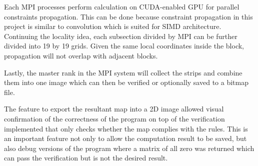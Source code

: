 Each MPI processes perform calculation on CUDA-enabled GPU for parallel constraints propagation. This can be done because constraint propagation in this project is similar to convolution which is suited for SIMD architecture. Continuing the locality idea, each subsection divided by MPI can be further divided into 19 by 19 grids. Given the same local coordinates inside the block, propagation will not overlap with adjacent blocks. 

Lastly, the master rank in the MPI system will collect the strips and combine them into one image which can then be verified or optionally saved to a bitmap file.


The feature to export the resultant map into a 2D image allowed visual confirmation of the correctness of the program on top of the verification implemented that only checks whether the map complies with the rules. This is an important feature not only to allow the computation result to be saved, but also debug versions of the program where a matrix of all zero was returned which can pass the verification but is not the desired result.